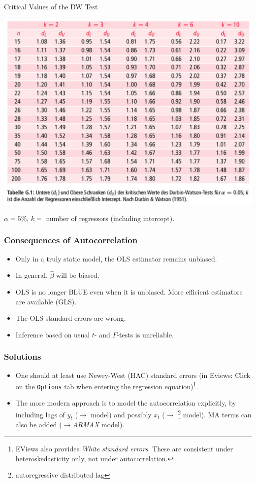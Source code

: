 \begin{frame}
\begin{block}{Critical Values of the DW Test}
\begin{center}
\includegraphics[width=.6\textwidth, trim=0 10ex 0 0, clip]{dwtable}
\end{center}
\small $\alpha=5$\%, $k=$ number of regressors (including intercept).
\end{block}
\end{frame}
\begin{frame}
\frametitle{Consequences of Autocorrelation}
\begin{itemize}
\item Only in a truly static model, the OLS estimator remains unbiased.

\item In general, $\widehat{\beta}$ will be biased.

\item OLS is no longer BLUE even when it is unbiased. More efficient estimators are available (GLS).

\item The OLS standard errors are wrong.

\item Inference based on usual $t$- and $F$-tests is unreliable.
\end{itemize}
\end{frame}
\begin{frame}
\frametitle{Solutions}
\begin{itemize}

\item One should at least use Newey-West  (HAC) standard errors (in Eviews: Click on the \texttt{Options} tab when entering the regression equation)\footnote{EViews also provides \emph{\color{red}White standard errors}. These are consistent under heteroskedasticity only, not under autocorrelation.}.
\item The more modern approach is to model the autocorrelation explicitly, by including lags of $y_t$ ($\rightarrow$  model) and possibly $x_t$ ($\rightarrow$ \footnote{autoregressive distributed lag} model). MA terms can also be added ($\rightarrow$\emph{\color{red}ARMAX} model).
\end{itemize}
\end{frame}

